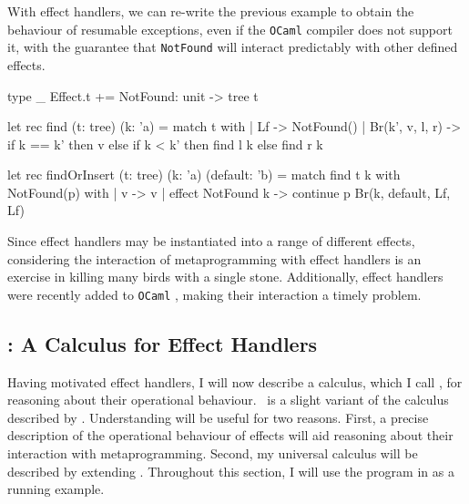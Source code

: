 With effect handlers, we can re-write the previous example to obtain the behaviour of resumable exceptions, even if the \texttt{OCaml} compiler does not support it, with the guarantee that \texttt{NotFound} will interact predictably with other defined effects.
\begin{ocaml}
type _ Effect.t += NotFound: unit -> tree t

let rec find (t: tree) (k: 'a) = match t with 
  | Lf -> NotFound()
  | Br(k', v, l, r) -> if k == k' then v 
                      else if k < k' then find l k
                            else find r k

let rec findOrInsert (t: tree) (k: 'a) (default: 'b) = 
  match find t k with NotFound(p) with 
  | v -> v
  | effect NotFound k -> continue p Br(k, default, Lf, Lf)
\end{ocaml}
Since effect handlers may be instantiated into a range of different effects, considering the interaction of metaprogramming with effect handlers is an exercise in killing many birds with a single stone. Additionally, effect handlers were recently added to \texttt{OCaml} \citep{sivaramakrishnan-21}, making their interaction a timely problem. 
\subsection{\texorpdfstring{\efflang{}}{Lambda-Op}: A Calculus for Effect Handlers}\label{subsection:effect-handler-calculus}
\newcommand{\print}[1]{\texttt{\textbf{print}(#1)}}
\newcommand{\readInt}[1]{\texttt{\textbf{read\_int}(#1)}}


Having motivated effect handlers, I will now describe a calculus, which I call \efflang, for reasoning about their operational behaviour.\ \efflang{} is a slight variant of the calculus described by \citet{pretnar-15}. Understanding \efflang{} will be useful for two reasons. First, a precise description of the operational behaviour of effects will aid reasoning about their interaction with metaprogramming. Second, my universal calculus will be described by extending \efflang. Throughout this section, I will use the \efflang{} program in  as a running example. 

